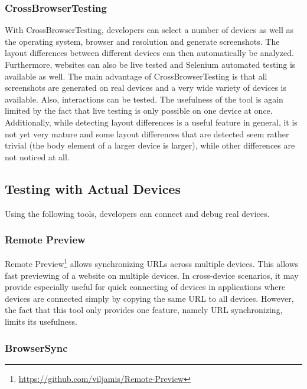 \subsubsection{CrossBrowserTesting}

With CrossBrowserTesting, developers can select a number of devices as well as the operating system, browser and resolution and generate screenshots. The layout differences between different devices can then automatically be analyzed. Furthermore, websites can also be live tested and Selenium automated testing is available as well. The main advantage of CrossBrowserTesting is that all screenshots are generated on real devices and a very wide variety of devices is available. Also, interactions can be tested. The usefulness of the tool is again limited by the fact that live testing is only possible on one device at once. Additionally, while detecting layout differences is a useful feature in general, it is not yet very mature and some layout differences that are detected seem rather trivial (the body element of a larger device is larger), while other differences are not noticed at all.

\subsection{Testing with Actual Devices}

Using the following tools, developers can connect and debug real devices. 

\subsubsection{Remote Preview}

Remote Preview\footnote{\url{https://github.com/viljamis/Remote-Preview}} allows synchronizing URLs across multiple devices. This allows fast previewing of a website on multiple devices. In cross-device scenarios, it may provide especially useful for quick connecting of devices in applications where devices are connected simply by copying the same URL to all devices. However, the fact that this tool only provides one feature, namely URL synchronizing, limits its usefulness.

\subsubsection{BrowserSync}

